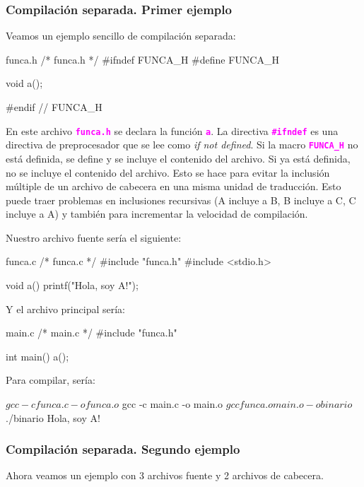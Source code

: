 \documentclass[]{scrartcl}
\newcommand{\hl}[1]{\textcolor{magenta}{\textbf{\texttt{#1}}}}
\begin{document}
\subsubsection*{Compilación separada. Primer ejemplo}
Veamos un ejemplo sencillo de compilación separada:

\begin{cbox}[]{funca.h}
  /* funca.h */
  #ifndef FUNCA_H
  #define FUNCA_H
  
  void a();
  
  #endif // FUNCA_H

\end{cbox}

En este archivo \hl{funca.h} se declara la función \hl{a}. La directiva \hl{\#ifndef} es una directiva de preprocesador que se lee como \textit{if not defined}. Si la macro \hl{FUNCA\_H} no está definida, se define y se incluye el contenido del archivo. Si ya está definida, no se incluye el contenido del archivo. Esto se hace para evitar la inclusión múltiple de un archivo de cabecera en una misma unidad de traducción. Esto puede traer problemas en inclusiones recursivas (A incluye a B, B incluye a C, C incluye a A) y también para incrementar la velocidad de compilación. 

Nuestro archivo fuente sería el siguiente:

\begin{cbox}[]{funca.c}
  /* funca.c */
  #include "funca.h"
  #include <stdio.h>

  void a(){
    printf("Hola, soy A!\n");
  }
\end{cbox}

Y el archivo principal sería:

\begin{cbox}[]{main.c}
  /* main.c */
  #include "funca.h"
  
  int main(){
    a();
  }
\end{cbox}

Para compilar, sería:

\begin{bashbox}
$ gcc -c funca.c -o funca.o
$ gcc -c main.c -o main.o
$ gcc funca.o main.o -o binario
$ ./binario
Hola, soy A!
\end{bashbox}

\subsubsection*{Compilación separada. Segundo ejemplo}

Ahora veamos un ejemplo con 3 archivos fuente y 2 archivos de cabecera.
\end{document}
